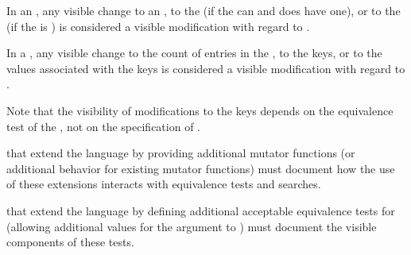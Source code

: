 \endsubsubsubsection%
 

In an , any visible change
     to an  ,
     to the  (if the  can and does have one),
  or to the  (if the  is )
is considered a visible modification with regard to .

\endsubsubsubsection%

 
In a , any visible change
     to the count of entries in the ,
     to the keys,
  or to the values associated with the keys
is considered a visible modification with regard to .

Note that the visibility of modifications to the keys depends on the equivalence test
of the , not on the specification of .
 
\endsubsubsubsection%

\endsubsubsection%


 that extend the language by providing additional mutator
functions (or additional behavior for existing mutator functions) must
document how the use of these extensions interacts with equivalence tests and
 searches.
 
 that extend the language by defining additional acceptable
equivalence tests for  (allowing additional values for the 
argument to ) must document the visible components of these
tests.

\endsubsubsection%


